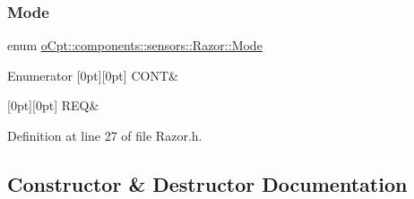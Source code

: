 \subsubsection{\texorpdfstring{Mode}{Mode}}
{\footnotesize\ttfamily enum \hyperlink{classo_cpt_1_1components_1_1sensors_1_1_razor_afed258e485aaaf9193a57d649ccb159b}{o\+Cpt\+::components\+::sensors\+::\+Razor\+::\+Mode}}

\begin{DoxyEnumFields}{Enumerator}
[0pt][0pt]{}\hypertarget{classo_cpt_1_1components_1_1sensors_1_1_razor_afed258e485aaaf9193a57d649ccb159ba512aed2858fbf6bf5c12ea88da01d5e2}{}\label{classo_cpt_1_1components_1_1sensors_1_1_razor_afed258e485aaaf9193a57d649ccb159ba512aed2858fbf6bf5c12ea88da01d5e2} 
C\+O\+NT&\\
\hline

[0pt][0pt]{}\hypertarget{classo_cpt_1_1components_1_1sensors_1_1_razor_afed258e485aaaf9193a57d649ccb159ba44c61c0088038c1222adbddd1664555b}{}\label{classo_cpt_1_1components_1_1sensors_1_1_razor_afed258e485aaaf9193a57d649ccb159ba44c61c0088038c1222adbddd1664555b} 
R\+EQ&\\
\hline

\end{DoxyEnumFields}


Definition at line 27 of file Razor.\+h.



\subsection{Constructor \& Destructor Documentation}
\hypertarget{classo_cpt_1_1components_1_1sensors_1_1_razor_a0434b265af592450a1acef4a95765575}{}\label{classo_cpt_1_1components_1_1sensors_1_1_razor_a0434b265af592450a1acef4a95765575} 
